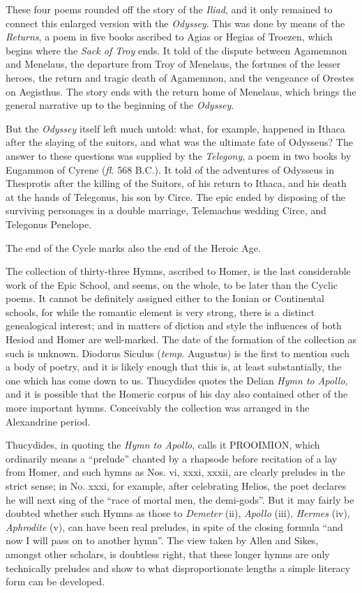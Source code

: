These four poems rounded off the story of the \emph{Iliad}, and it only
remained to connect this enlarged version with the \emph{Odyssey}. This was
done by means of the \emph{Returns}, a poem in five books ascribed to Agias or
Hegias of Troezen, which begins where the \emph{Sack of Troy} ends. It told of
the dispute between Agamemnon and Menelaus, the departure from Troy of
Menelaus, the fortunes of the lesser heroes, the return and tragic death of
Agamemnon, and the vengeance of Orestes on Aegisthus. The story ends with the
return home of Menelaus, which brings the general narrative up to the beginning
of the \emph{Odyssey}.

But the \emph{Odyssey} itself left much untold: what, for example, happened in
Ithaca after the slaying of the suitors, and what was the ultimate fate of
Odysseus? The answer to these questions was supplied by the \emph{Telegony}, a
poem in two books by Eugammon of Cyrene (\emph{fl}. 568 B.C.). It told of the
adventures of Odysseus in Thesprotis after the killing of the Suitors, of his
return to Ithaca, and his death at the hands of Telegonus, his son by Circe.
The epic ended by disposing of the surviving personages in a double marriage,
Telemachus wedding Circe, and Telegonus Penelope.

The end of the Cycle marks also the end of the Heroic Age.


The collection of thirty-three Hymns, ascribed to Homer, is the last
considerable work of the Epic School, and seems, on the whole, to be later than
the Cyclic poems. It cannot be definitely assigned either to the Ionian or
Continental schools, for while the romantic element is very strong, there is a
distinct genealogical interest; and in matters of diction and style the
influences of both Hesiod and Homer are well-marked. The date of the formation
of the collection as such is unknown. Diodorus Siculus (\emph{temp}. Augustus)
is the first to mention such a body of poetry, and it is likely enough that
this is, at least substantially, the one which has come down to us. Thucydides
quotes the Delian \emph{Hymn to Apollo}, and it is possible that the Homeric
corpus of his day also contained other of the more important hymns. Conceivably
the collection was arranged in the Alexandrine period.

Thucydides, in quoting the \emph{Hymn to Apollo}, calls it PROOIMION, which
ordinarily means a “prelude” chanted by a rhapsode before
recitation of a lay from Homer, and such hymns as Nos. vi, xxxi, xxxii, are
clearly preludes in the strict sense; in No. xxxi, for example, after
celebrating Helios, the poet declares he will next sing of the “race of
mortal men, the demi-gods”. But it may fairly be doubted whether such
Hymns as those to \emph{Demeter} (ii), \emph{Apollo} (iii), \emph{Hermes} (iv),
\emph{Aphrodite} (v), can have been real preludes, in spite of the closing
formula “and now I will pass on to another hymn”. The view taken by
Allen and Sikes, amongst other scholars, is doubtless right, that these longer
hymns are only technically preludes and show to what disproportionate lengths a
simple literacy form can be developed.

